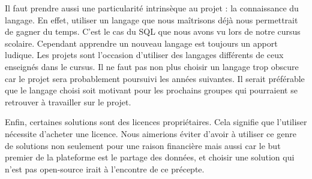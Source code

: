     Il faut prendre aussi une particularité intrinsèque au projet : la connaissance du langage. En effet, utiliser un langage que nous maîtrisons déjà nous permettrait de gagner du temps. C’est le cas du SQL que nous avons vu lors de notre cursus scolaire. Cependant apprendre un nouveau langage est toujours un apport ludique. Les projets sont l’occasion d’utiliser des langages différents de ceux enseignés dans le cursus. Il ne faut pas non plus choisir un langage trop obscure car le projet sera probablement poursuivi les années suivantes. Il serait préférable que le langage choisi soit motivant pour les prochains groupes qui pourraient se retrouver à travailler sur le projet.
       
    Enfin, certaines solutions sont des licences propriétaires. Cela signifie que l’utiliser nécessite d’acheter une licence. Nous aimerions éviter d’avoir à utiliser ce genre de solutions non seulement pour une raison financière mais aussi car le but premier de la plateforme est le partage des données, et choisir une solution qui n’est pas open-source irait à l’encontre de ce précepte.



